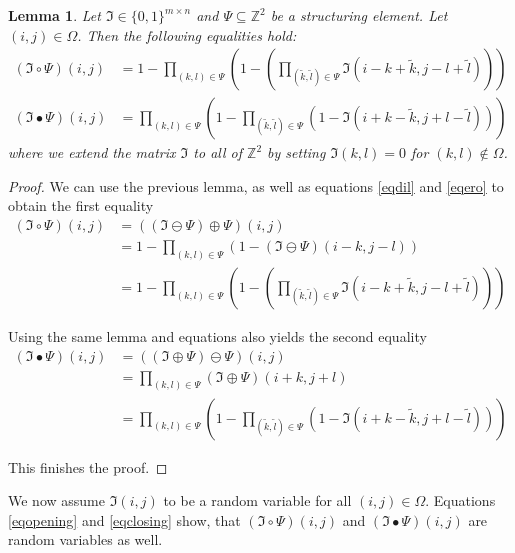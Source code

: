 \documentclass[a4paper,12pt]{article}
\theoremstyle{plain}
\newtheorem{lemma}[theorem]{Lemma}
\theoremstyle{definition}
\begin{document}
\begin{lemma}
	Let $\mathfrak{I} \in \{ 0, 1 \}^{m \times n}$ and $\Psi \subseteq \mathbb{Z}^2$ be a structuring element. Let $(i, j) \in \Omega$. Then the following equalities hold:
	\begin{align}
		(\mathfrak{I} \circ \Psi)(i, j) &= 1 - \prod_{(k, l) \in \Psi} \left( 1 - \left( \prod_{(\tilde{k}, \tilde{l}) \in \Psi} \mathfrak{I}(i - k + \tilde{k}, j - l + \tilde{l}) \right) \right) \label{eqopening} \\
		(\mathfrak{I} \bullet \Psi)(i, j) &= \prod_{(k, l) \in \Psi} \left( 1 - \prod_{(\tilde{k}, \tilde{l}) \in \Psi} ( 1 - \mathfrak{I}(i + k - \tilde{k}, j + l - \tilde{l}) ) \right) \label{eqclosing}
	\end{align}
	where we extend the matrix $\mathfrak{I}$ to all of $\mathbb{Z}^2$ by setting $\mathfrak{I}(k, l) = 0$ for $(k, l) \notin \Omega$.
\end{lemma}
\begin{proof}
	We can use the previous lemma, as well as equations \eqref{eqdil} and \eqref{eqero} to obtain the first equality
	\begin{align*}
		(\mathfrak{I} \circ \Psi)(i, j) &= ((\mathfrak{I} \ominus \Psi) \oplus \Psi)(i, j) \\
		&= 1 - \prod_{(k, l) \in \Psi} ( 1 - (\mathfrak{I} \ominus \Psi)(i - k, j - l) ) \\
		&= 1 - \prod_{(k, l) \in \Psi} \left( 1 - \left( \prod_{(\tilde{k}, \tilde{l}) \in \Psi} \mathfrak{I}(i - k + \tilde{k}, j - l + \tilde{l}) \right) \right)
	\end{align*}
	
	Using the same lemma and equations also yields the second equality
	\begin{align*}
		(\mathfrak{I} \bullet \Psi)(i, j) &= ((\mathfrak{I} \oplus \Psi) \ominus \Psi)(i, j) \\
		&= \prod_{(k, l) \in \Psi} (\mathfrak{I} \oplus \Psi)(i + k, j + l) \\
		&= \prod_{(k, l) \in \Psi} \left( 1 - \prod_{(\tilde{k}, \tilde{l}) \in \Psi} ( 1 - \mathfrak{I}(i + k - \tilde{k}, j + l - \tilde{l}) ) \right)
	\end{align*}
	
	This finishes the proof.
\end{proof}

We now assume $\mathfrak{I}(i, j)$ to be a random variable for all $(i, j) \in \Omega$. Equations \eqref{eqopening} and \eqref{eqclosing} show, that $(\mathfrak{I} \circ \Psi)(i, j)$ and $(\mathfrak{I} \bullet \Psi)(i, j)$ are random variables as well.
\end{document}
